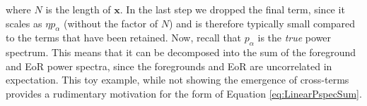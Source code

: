 \documentclass[preprint2,numberedappendix,tighten]{aastex6}  %
\newcommand{\x}{\mathbf{x}}
\newcommand{\acl}[1]{{\color{red} \textbf{[ACL:  #1]}}}
\begin{document}
where $N$ is the length of $\x$. In the last step we dropped the final term, since it scales as $\eta p_\alpha$ (without the factor of $N$) and is therefore typically small compared to the terms that have been retained. Now, recall that $p_\alpha$ is the \emph{true} power spectrum. This means that it can be decomposed into the sum of the foreground and EoR power spectra, since the foregrounds and EoR are uncorrelated in expectation. This toy example, while not showing the emergence of cross-terms provides a rudimentary motivation for the form of Equation \eqref{eq:LinearPspecSum}. 

\end{document}
